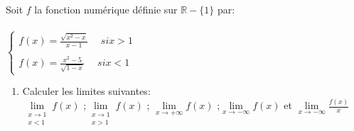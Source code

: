 \documentclass[12pt,a4paper]{report}
\newcommand{\R}{\mathbb{R}}
\begin{document}
	\begin{mybox}{}
		Soit $f$ la fonction numérique définie sur $\R-\{1\}$ par:\\
		\\
		$\left\{
		\begin{array}{l}
			f(x)=\frac{\sqrt{x^2-x}}{x-1}\; \quad si x>1\\
			\\
			f(x)=\frac{x^2-5}{\sqrt{1-x}}\; \quad si x<1
		\end{array}\right.$\\
		
		\begin{enumerate}
			\item Calculer les limites suivantes:\\
			$\lim\limits_{\substack{x \to 1\\ x<1}}f(x)$\; ;\qquad $\lim\limits_{\substack{x \to 1\\ x>1}}f(x)$\; ;\qquad
			$\lim\limits_{x \to +\infty}f(x)$\; ;\qquad $\lim\limits_{x \to -\infty}f(x)$\; et \; $\lim\limits_{x \to -\infty}\frac{f(x)}{x}$
		\end{enumerate}
	\end{mybox}
	
\end{document}
